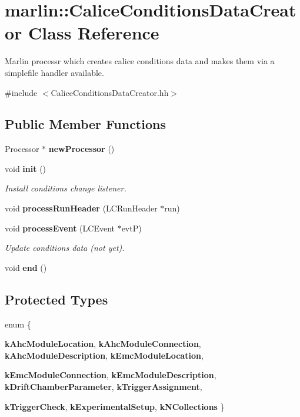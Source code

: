 \section{marlin::CaliceConditionsDataCreator Class Reference}
\label{classmarlin_1_1CaliceConditionsDataCreator}


Marlin processr which creates calice conditions data and makes them via a simplefile handler available.  


{\ttfamily \#include $<$CaliceConditionsDataCreator.hh$>$}\subsection*{Public Member Functions}
\begin{DoxyCompactItemize}
\item 
Processor $\ast$ {\bfseries newProcessor} ()\label{classmarlin_1_1CaliceConditionsDataCreator_a602c419bdb5c11770dd620711941f175}

\item 
void {\bf init} ()
\begin{DoxyCompactList}\small\item\em Install conditions change listener. \item\end{DoxyCompactList}\item 
void {\bfseries processRunHeader} (LCRunHeader $\ast$run)\label{classmarlin_1_1CaliceConditionsDataCreator_add37acebb16fb3faa09f17afa353ad6a}

\item 
void {\bf processEvent} (LCEvent $\ast$evtP)\label{classmarlin_1_1CaliceConditionsDataCreator_a1a7b0067f58a6376ab5e9ba73d389280}

\begin{DoxyCompactList}\small\item\em Update conditions data (not yet). \item\end{DoxyCompactList}\item 
void {\bfseries end} ()\label{classmarlin_1_1CaliceConditionsDataCreator_a7903f04212f4cbb7f95fecd657c289f0}

\end{DoxyCompactItemize}
\subsection*{Protected Types}
\begin{DoxyCompactItemize}
\item 
enum \{ \par
{\bfseries kAhcModuleLocation}, 
{\bfseries kAhcModuleConnection}, 
{\bfseries kAhcModuleDescription}, 
{\bfseries kEmcModuleLocation}, 
\par
{\bfseries kEmcModuleConnection}, 
{\bfseries kEmcModuleDescription}, 
{\bfseries kDriftChamberParameter}, 
{\bfseries kTriggerAssignment}, 
\par
{\bfseries kTriggerCheck}, 
{\bfseries kExperimentalSetup}, 
{\bfseries kNCollections}
 \}
\end{DoxyCompactItemize}
